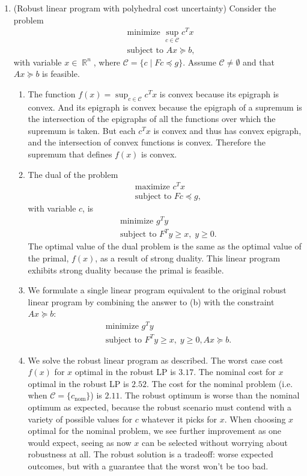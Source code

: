 \documentclass{article}
\DeclareMathOperator{\R}{\mathbb{R}}
\begin{document}
\begin{enumerate}
    \item (Robust linear program with polyhedral cost uncertainty) Consider the problem \begin{align*}
        &\text{minimize } \sup_{c \in \mathcal{C}} c^T x \\
        &\text{subject to } Ax \succeq b,
    \end{align*} with variable $x \in \R^n$, where $\mathcal{C} = \{c \mid Fc \preceq g\}$. Assume $\mathcal{C} \neq \emptyset$ and that $Ax \succeq b$ is feasible.
    \begin{enumerate}
        \item The function $f(x) = \sup_{c \in \mathcal{C}} c^T x$ is convex because its epigraph is convex. And its epigraph is convex because the epigraph of a supremum is the intersection of the epigraphs of all the functions over which the supremum is taken. But each $c^T x$ is convex and thus has convex epigraph, and the intersection of convex functions is convex. Therefore the supremum that defines $f(x)$ is convex.
        \item The dual of the problem \begin{align*}
            &\text{maximize } c^T x \\
            &\text{subject to } Fc \preceq g,
        \end{align*} with variable $c$, is \begin{align*}
            &\text{minimize } g^T y \\
            &\text{subject to } F^T y \geq x, \; y \geq 0.
        \end{align*} The optimal value of the dual problem is the same as the optimal value of the primal, $f(x)$, as a result of strong duality. This linear program exhibits strong duality because the primal is feasible.
    \item We formulate a single linear program equivalent to the original robust linear program by combining the answer to (b) with the constraint $Ax \succeq b$: \begin{align*}
            &\text{minimize } g^T y \\
            &\text{subject to } F^T y \geq x, \; y \geq 0, Ax \succeq b.
        \end{align*}
    \item We solve the robust linear program as described. The worst case cost $f(x)$ for $x$ optimal in the robust LP is $3.17$. The nominal cost for $x$ optimal in the robust LP is $2.52$. The cost for the nominal problem (i.e. when $\mathcal{C} = \{c_\text{nom}\}$) is $2.11$. The robust optimum is worse than the nominal optimum as expected, because the robust scenario must contend with a variety of possible values for $c$ whatever it picks for $x$. When choosing $x$ optimal for the nominal problem, we see further improvement as one would expect, seeing as now $x$ can be selected without worrying about robustness at all. The robust solution is a tradeoff: worse expected outcomes, but with a guarantee that the worst won't be too bad. 
    \end{enumerate}
\end{enumerate}
\end{document}
